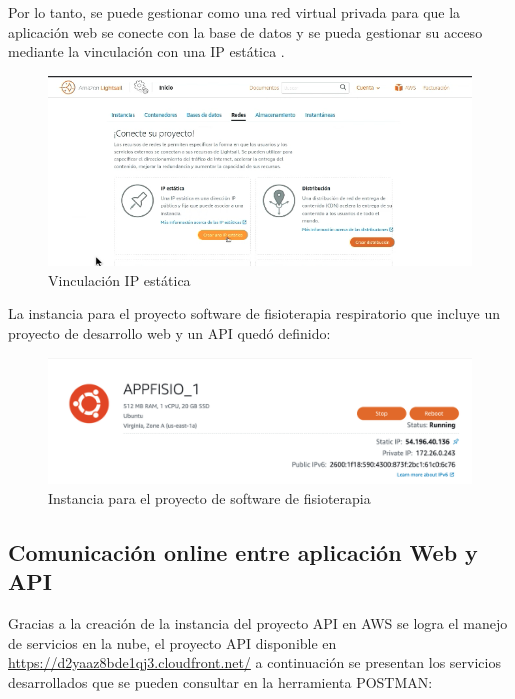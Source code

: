 \documentclass[12pt]{article}
\begin{document}
Por lo tanto, se puede gestionar como una red virtual privada para que la aplicación web se conecte con la base de datos y se pueda gestionar su acceso mediante la vinculación con una IP estática .

\begin{figure}[ht]
\centering
\includegraphics[scale=0.4]{imag/IPestaticaAWS.png}
\caption{Vinculación IP estática }
\label{6}
\end{figure}
\FloatBarrier


La instancia para el proyecto software de fisioterapia respiratorio que incluye un proyecto de desarrollo web y un API quedó definido:

\begin{figure}[ht]
\centering
\includegraphics[scale=0.4]{imag/instanciafisio.png}
\caption{Instancia para el proyecto de software de fisioterapia}
\label{6}
\end{figure}
\FloatBarrier







\subsection{Comunicación online entre aplicación Web y API}

Gracias a la creación de la instancia del proyecto API en AWS se logra el manejo de servicios en la nube, el proyecto API disponible en \url{https://d2yaaz8bde1qj3.cloudfront.net/} a continuación se presentan los servicios desarrollados que se pueden consultar en la herramienta POSTMAN:
\end{document}
